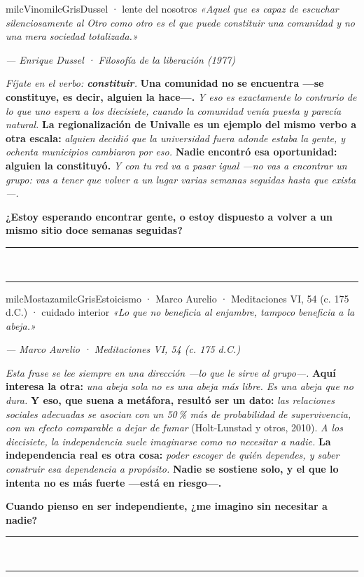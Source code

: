 \documentclass[11pt,letterpaper]{article}
\newcommand{\linead}[1]{\noindent\color{milcLinea}\rule{#1}{0.5pt}\color{milcNegro}}
\begin{document}
\begin{softbox}{milcVino}{milcGris}{Dussel · lente del nosotros}
\textit{«Aquel que es capaz de escuchar silenciosamente al Otro como otro es el que puede constituir una comunidad y no una mera sociedad totalizada.»}

{\footnotesize\itshape\color{milcNegro!70}--- Enrique Dussel · Filosofía de la liberación (1977)}

\emph{Fíjate en el verbo: \textbf{constituir}.} \textbf{Una comunidad no se encuentra ---se constituye, es decir, alguien la hace---.} \emph{Y eso es exactamente lo contrario de lo que uno espera a los diecisiete, cuando la comunidad venía puesta y parecía natural.} \textbf{La regionalización de Univalle es un ejemplo del mismo verbo a otra escala:} \emph{alguien decidió que la universidad fuera adonde estaba la gente, y ochenta municipios cambiaron por eso.} \textbf{Nadie encontró esa oportunidad: alguien la constituyó.} \emph{Y con tu red va a pasar igual ---no vas a \emph{encontrar} un grupo: vas a tener que volver a un lugar varias semanas seguidas hasta que exista---.}

\textbf{¿Estoy esperando encontrar gente, o estoy dispuesto a volver a un mismo sitio doce semanas seguidas?}
\end{softbox}
\linead{\linewidth}\\[1mm]
\linead{\linewidth}

\begin{softbox}{milcMostaza}{milcGris}{Estoicismo · Marco Aurelio · Meditaciones VI, 54 (c. 175 d.C.) · cuidado interior}
\textit{«Lo que no beneficia al enjambre, tampoco beneficia a la abeja.»}

{\footnotesize\itshape\color{milcNegro!70}--- Marco Aurelio · Meditaciones VI, 54 (c. 175 d.C.)}

\emph{Esta frase se lee siempre en una dirección ---lo que le sirve al grupo---.} \textbf{Aquí interesa la otra:} \emph{una abeja sola no es una abeja más libre. Es una abeja que no dura.} \textbf{Y eso, que suena a metáfora, resultó ser un dato:} \emph{las relaciones sociales adecuadas se asocian con un 50\,\% más de probabilidad de supervivencia, con un efecto comparable a dejar de fumar} (Holt-Lunstad y otros, 2010). \emph{A los diecisiete, la independencia suele imaginarse como no necesitar a nadie.} \textbf{La independencia real es otra cosa:} \emph{poder escoger de quién dependes, y saber construir esa dependencia a propósito.} \textbf{Nadie se sostiene solo, y el que lo intenta no es más fuerte ---está en riesgo---.}

\textbf{Cuando pienso en ser independiente, ¿me imagino sin necesitar a nadie?}
\end{softbox}
\linead{\linewidth}\\[1mm]
\linead{\linewidth}
\end{document}
